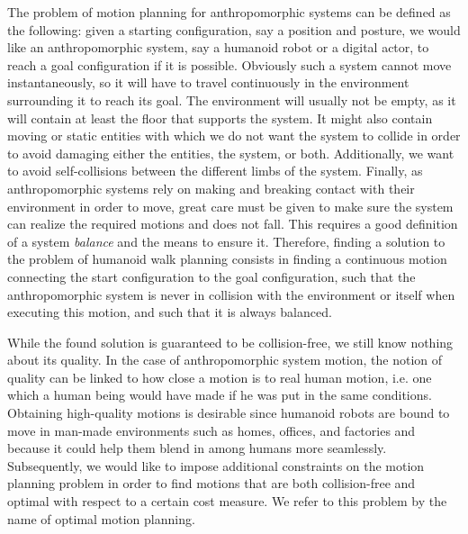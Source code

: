 The problem of motion planning for anthropomorphic systems can be
defined as the following: given a starting configuration, say a
position and posture, we would like an anthropomorphic system, say a
humanoid robot or a digital actor, to reach a goal configuration if it
is possible. Obviously such a system cannot move instantaneously, so
it will have to travel continuously in the environment surrounding it
to reach its goal. The environment will usually not be empty, as it
will contain at least the floor that supports the system. It might
also contain moving or static entities with which we do not want the
system to collide in order to avoid damaging either the entities, the
system, or both. Additionally, we want to avoid self-collisions
between the different limbs of the system. Finally, as anthropomorphic
systems rely on making and breaking contact with their environment in
order to move, great care must be given to make sure the system can
realize the required motions and does not fall. This requires a good
definition of a system \emph{balance} and the means to ensure
it. Therefore, finding a solution to the problem of humanoid walk
planning consists in finding a continuous motion connecting the start
configuration to the goal configuration, such that the anthropomorphic
system is never in collision with the environment or itself when
executing this motion, and such that it is always balanced.

While the found solution is guaranteed to be collision-free, we still
know nothing about its quality. In the case of anthropomorphic system
motion, the notion of quality can be linked to how close a motion is
to real human motion, i.e. one which a human being would have made if
he was put in the same conditions. Obtaining high-quality motions is
desirable since humanoid robots are bound to move in man-made
environments such as homes, offices, and factories and because it
could help them blend in among humans more seamlessly. Subsequently,
we would like to impose additional constraints on the motion planning
problem in order to find motions that are both collision-free and
optimal with respect to a certain cost measure. We refer to this
problem by the name of optimal motion planning.

